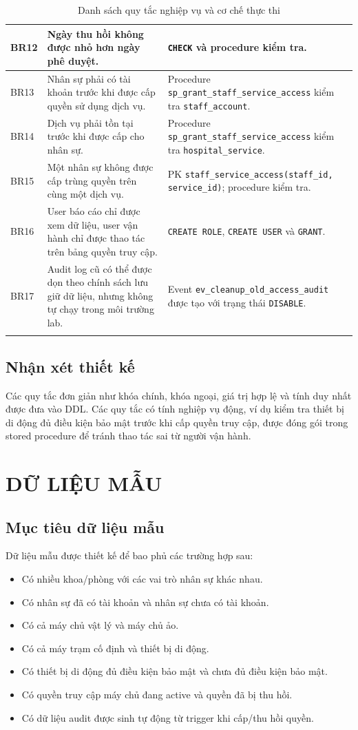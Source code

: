 \documentclass[12pt, a4paper, oneside, openany]{report}
\newcommand{\dbid}[1]{{\normalfont\ttfamily\footnotesize\nolinkurl{#1}}}
\begin{document}
\begin{longtable}{|L{1.4cm}|L{6.3cm}|L{5.8cm}|}
\hline
BR12 & Ngày thu hồi không được nhỏ hơn ngày phê duyệt. & \texttt{CHECK} và procedure kiểm tra. \\
\hline
BR13 & Nhân sự phải có tài khoản trước khi được cấp quyền sử dụng dịch vụ. & Procedure \dbid{sp_grant_staff_service_access} kiểm tra \dbid{staff_account}. \\
\hline
BR14 & Dịch vụ phải tồn tại trước khi được cấp cho nhân sự. & Procedure \dbid{sp_grant_staff_service_access} kiểm tra \dbid{hospital_service}. \\
\hline
BR15 & Một nhân sự không được cấp trùng quyền trên cùng một dịch vụ. & PK \dbid{staff_service_access(staff_id, service_id)}; procedure kiểm tra. \\
\hline
BR16 & User báo cáo chỉ được xem dữ liệu, user vận hành chỉ được thao tác trên bảng quyền truy cập. & \texttt{CREATE ROLE}, \texttt{CREATE USER} và \texttt{GRANT}. \\
\hline
BR17 & Audit log cũ có thể được dọn theo chính sách lưu giữ dữ liệu, nhưng không tự chạy trong môi trường lab. & Event \dbid{ev_cleanup_old_access_audit} được tạo với trạng thái \texttt{DISABLE}. \\
\hline
\caption{Danh sách quy tắc nghiệp vụ và cơ chế thực thi}
\end{longtable}

\section{Nhận xét thiết kế}

Các quy tắc đơn giản như khóa chính, khóa ngoại, giá trị hợp lệ và tính duy nhất được đưa vào DDL. Các quy tắc có tính nghiệp vụ động, ví dụ kiểm tra thiết bị di động đủ điều kiện bảo mật trước khi cấp quyền truy cập, được đóng gói trong stored procedure để tránh thao tác sai từ người vận hành.

\chapter{DỮ LIỆU MẪU}

\section{Mục tiêu dữ liệu mẫu}

Dữ liệu mẫu được thiết kế để bao phủ các trường hợp sau:
\begin{itemize}
    \item Có nhiều khoa/phòng với các vai trò nhân sự khác nhau.
    \item Có nhân sự đã có tài khoản và nhân sự chưa có tài khoản.
    \item Có cả máy chủ vật lý và máy chủ ảo.
    \item Có cả máy trạm cố định và thiết bị di động.
    \item Có thiết bị di động đủ điều kiện bảo mật và chưa đủ điều kiện bảo mật.
    \item Có quyền truy cập máy chủ đang active và quyền đã bị thu hồi.
    \item Có dữ liệu audit được sinh tự động từ trigger khi cấp/thu hồi quyền.
\end{itemize}
\end{document}
